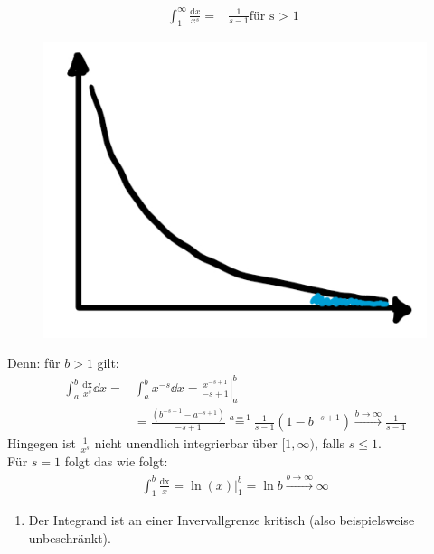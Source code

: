 \begin{Beispiel}{
	\begin{align*}
		\int_1^{\infty} \frac{\mathrm{d}x}{x^s} = & \frac{1}{s-1} \text{für s > 1 }
	\end{align*}
	\begin{figure}
		\centering
		\includegraphics[scale=0.3]{Skizzen/plot_bsp_uneigentlichesIntegral}
	\end{figure}
	Denn: für $b > 1$ gilt:
	\begin{align*}
		\int_a^b \frac{\mathrm{dx}}{x^s} \dd{x} = & \int_a^b x^{-s} \dd{x}
		  = \left.\frac{x^{-s+1}}{-s+1} \right\vert_a^b \\
		  & = \frac{\left( b^{-s+1} - a^{-s+1}\right)}{-s+1} \overset{a = 1}{=}
		  \frac{1}{s-1}\left(1-b^{-s+1}\right) 
		  \overset{b \rightarrow \infty}{\longrightarrow}
		  \frac{1}{s-1}
	\end{align*}
	Hingegen ist $\frac{1}{x^s}$ nicht unendlich integrierbar über $[1, \infty)$,
	falls $s \leq 1$.\\
	Für $s=1$ folgt das wie folgt:
	\begin{align*}
		\int_1^b \frac{\mathrm{dx}}{x} = \left. \ln(x) \right\vert_1^b 
		= \ln b \overset{b \rightarrow \infty}{\longrightarrow} \infty
	\end{align*}
}\end{Beispiel}

\begin{enumerate}[resume]
	\item Der Integrand ist an einer Invervallgrenze kritisch (also beispielsweise 
	unbeschränkt).
\end{enumerate}

